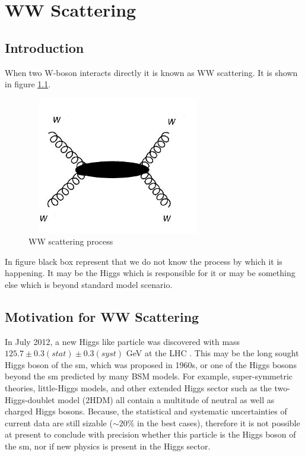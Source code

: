\chapter{WW Scattering}
\section{Introduction}
When two W-boson interacts directly it is known as WW scattering. It is shown in figure \ref{wwscattering1}.
\begin{figure}[htb]
	\begin{center}
		\includegraphics[width=8.0cm,height=6cm]{figures/VBS/H-mediated.png}
		\caption{WW scattering process}
		\label{wwscattering1}
	\end{center}
\end{figure} 
In figure black box represent that we do not know the process by which it is happening. It may be the Higgs which is responsible for it or may be something else which is beyond standard model scenario.
\section{Motivation for WW Scattering}
In July 2012, a new Higgs like particle was discovered with mass $125.7\pm 0.3(stat)\pm 0.3 (syst)$ GeV at the LHC \cite{paper:Higgs2013}. This may be the long sought Higgs boson of the {sm}, which was proposed in 1960s, or one of the Higgs bosons beyond the {sm} predicted by many BSM models. For example, super-symmetric theories, little-Higgs models, and other extended Higgs sector such as the two-Higgs-doublet model (2HDM) all contain a multitude of neutral as well as charged Higgs bosons\cite{paper:13036335v1}. Because, the statistical and systematic uncertainties of current data are still sizable ($\sim20\%$ in the best cases), therefore it is not possible at present to conclude with precision whether this particle is the Higgs boson of the {sm}, nor if new physics is present in the Higgs sector\cite{paper:Higgs2013}.

